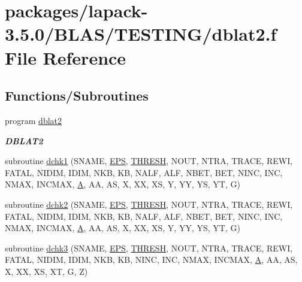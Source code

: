 \hypertarget{dblat2_8f}{}\section{packages/lapack-\/3.5.0/\+B\+L\+A\+S/\+T\+E\+S\+T\+I\+N\+G/dblat2.f File Reference}
\label{dblat2_8f}
\subsection*{Functions/\+Subroutines}
\begin{DoxyCompactItemize}
\item 
program \hyperlink{group__double__blas__testing_ga7003ac6a725228e895e4e675b3ef1775}{dblat2}
\begin{DoxyCompactList}\small\item\em {\bfseries D\+B\+L\+A\+T2} \end{DoxyCompactList}\item 
subroutine \hyperlink{dblat2_8f_abc28e954ae40095eb4051416b83bec18}{dchk1} (S\+N\+A\+M\+E, \hyperlink{tukey_8c_a6ebf6899d6c1c8b7b9d09be872c05aae}{E\+P\+S}, \hyperlink{zlaqgs_8c_a0656018abfc9fa2821827415f5d5ea57}{T\+H\+R\+E\+S\+H}, N\+O\+U\+T, N\+T\+R\+A, T\+R\+A\+C\+E, R\+E\+W\+I, F\+A\+T\+A\+L, N\+I\+D\+I\+M, I\+D\+I\+M, N\+K\+B, K\+B, N\+A\+L\+F, A\+L\+F, N\+B\+E\+T, B\+E\+T, N\+I\+N\+C, I\+N\+C, N\+M\+A\+X, I\+N\+C\+M\+A\+X, \hyperlink{classA}{A}, A\+A, A\+S, X, X\+X, X\+S, Y, Y\+Y, Y\+S, Y\+T, G)
\item 
subroutine \hyperlink{dblat2_8f_a3589e340665ad60c229f4efdc79a6229}{dchk2} (S\+N\+A\+M\+E, \hyperlink{tukey_8c_a6ebf6899d6c1c8b7b9d09be872c05aae}{E\+P\+S}, \hyperlink{zlaqgs_8c_a0656018abfc9fa2821827415f5d5ea57}{T\+H\+R\+E\+S\+H}, N\+O\+U\+T, N\+T\+R\+A, T\+R\+A\+C\+E, R\+E\+W\+I, F\+A\+T\+A\+L, N\+I\+D\+I\+M, I\+D\+I\+M, N\+K\+B, K\+B, N\+A\+L\+F, A\+L\+F, N\+B\+E\+T, B\+E\+T, N\+I\+N\+C, I\+N\+C, N\+M\+A\+X, I\+N\+C\+M\+A\+X, \hyperlink{classA}{A}, A\+A, A\+S, X, X\+X, X\+S, Y, Y\+Y, Y\+S, Y\+T, G)
\item 
subroutine \hyperlink{dblat2_8f_a96c113ecd52e4867dc5d4fb4735e9489}{dchk3} (S\+N\+A\+M\+E, \hyperlink{tukey_8c_a6ebf6899d6c1c8b7b9d09be872c05aae}{E\+P\+S}, \hyperlink{zlaqgs_8c_a0656018abfc9fa2821827415f5d5ea57}{T\+H\+R\+E\+S\+H}, N\+O\+U\+T, N\+T\+R\+A, T\+R\+A\+C\+E, R\+E\+W\+I, F\+A\+T\+A\+L, N\+I\+D\+I\+M, I\+D\+I\+M, N\+K\+B, K\+B, N\+I\+N\+C, I\+N\+C, N\+M\+A\+X, I\+N\+C\+M\+A\+X, \hyperlink{classA}{A}, A\+A, A\+S, X, X\+X, X\+S, X\+T, G, Z)

\end{DoxyCompactItemize}
